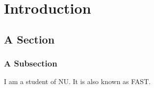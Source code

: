 \chapter{Introduction}
\label{chap:introduction}
\section{A Section}
\label{sec:abc}
\subsection{A Subsection}
I am a student of NU.  It is also known as FAST.